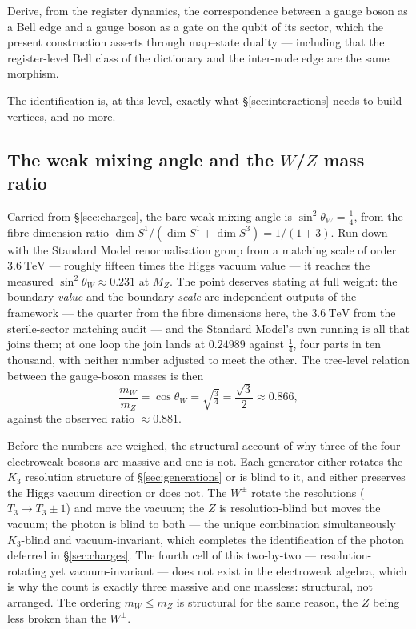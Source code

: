 \begin{openproblem}\label{op:state-gate}
Derive, from the register dynamics, the correspondence between a gauge boson as a Bell edge and a
gauge boson as a gate on the qubit of its sector, which the present construction asserts through
map--state duality --- including that the register-level Bell class of the dictionary and the
inter-node edge are the same morphism.
\end{openproblem}

The identification is, at this level, exactly what \S\ref{sec:interactions} needs to build vertices,
and no more.

\subsection{The weak mixing angle and the \texorpdfstring{$W$/$Z$}{W/Z} mass ratio}

Carried from \S\ref{sec:charges}, the bare weak mixing angle is $\sin^2\theta_W = \tfrac14$, from the
fibre-dimension ratio $\dim S^1/(\dim S^1 + \dim S^3) = 1/(1+3)$. Run down with the Standard Model
renormalisation group from a matching scale of order $3.6\ \mathrm{TeV}$ --- roughly fifteen times
the Higgs vacuum value --- it reaches the measured $\sin^2\theta_W \approx 0.231$ at $M_Z$. The
point deserves stating at full weight: the boundary \emph{value} and the boundary \emph{scale} are
independent outputs of the framework --- the quarter from the fibre dimensions here, the
$3.6\ \mathrm{TeV}$ from the sterile-sector matching audit --- and the Standard Model's own
running is all that joins them; at one loop the join lands at $0.24989$ against $\tfrac14$, four
parts in ten thousand, with neither number adjusted to meet the other. The tree-level
relation between the gauge-boson masses is then
\begin{equation}
  \frac{m_W}{m_Z} = \cos\theta_W = \sqrt{\tfrac34} = \frac{\sqrt3}{2} \approx 0.866,
\end{equation}
against the observed ratio $\approx 0.881$.

Before the numbers are weighed, the structural account of why three of the four electroweak bosons
are massive and one is not. Each generator either rotates the $K_3$ resolution structure of
\S\ref{sec:generations} or is blind to it, and either preserves the Higgs vacuum direction or does
not. The $W^\pm$ rotate the resolutions ($T_3 \to T_3 \pm 1$) and move the vacuum; the $Z$ is
resolution-blind but moves the vacuum; the photon is blind to both --- the unique combination
simultaneously $K_3$-blind and vacuum-invariant, which completes the identification of the photon
deferred in \S\ref{sec:charges}. The fourth cell of this two-by-two --- resolution-rotating yet
vacuum-invariant --- does not exist in the electroweak algebra, which is why the count is exactly
three massive and one massless: structural, not arranged. The ordering $m_W \le m_Z$ is structural
for the same reason, the $Z$ being less broken than the $W^\pm$.


